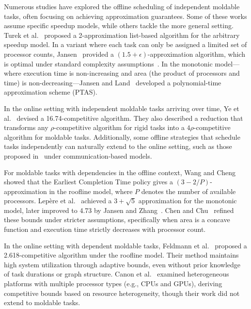 \documentclass{article}
\begin{document}
Numerous studies have explored the offline scheduling of independent moldable tasks, often focusing on achieving approximation guarantees. Some of these works assume specific speedup models, while others tackle the more general setting. Turek et al.~\cite{Turek92} proposed a 2-approximation list-based algorithm for the arbitrary speedup model. In a variant where each task can only be assigned a limited set of processor counts, Jansen~\cite{Jansen12_3over2} provided a $(1.5 + \epsilon)$-approximation algorithm, which is optimal under standard complexity        assumptions~\cite{Johannes06_list}. In the monotonic model—where execution time is non-increasing and area (the product of processors and time) is non-decreasing—Jansen and Land~\cite{Jansen18_PTAS} developed a polynomial-time approximation scheme (PTAS).

In the online setting with independent moldable tasks arriving over time, Ye et al.~\cite{Ye18_online} devised a 16.74-competitive algorithm. They also described a reduction that transforms any $\rho$-competitive algorithm for rigid tasks into a $4\rho$-competitive algorithm for moldable tasks. Additionally, some offline strategies that schedule tasks independently can naturally extend to the online setting, such as those proposed in~\cite{Havill08_SET, Dutton07_ECT, Kell15_Improved} under communication-based models.

For moldable tasks with dependencies in the offline context, Wang and Cheng~\cite{Wang92_DAG} showed that the Earliest Completion Time policy gives a $(3 - 2/P)$-approximation in the roofline model, where $P$ denotes the number of available processors. Lep\`{e}re et al.~\cite{Lepere01_DAG} achieved a $3 + \sqrt{5}$ approximation for the monotonic model, later improved to 4.73 by Jansen and Zhang~\cite{Jansen06_DAG}. Chen and Chu~\cite{Chen13_concave} refined these bounds under stricter assumptions, specifically when area is a concave function and execution time strictly decreases with processor count.

In the online setting with dependent moldable tasks, Feldmann et al.~\cite{Feldmann98_DAG} proposed a 2.618-competitive algorithm under the roofline model. Their method maintains high system utilization through adaptive bounds, even without prior knowledge of task durations or graph structure. Canon et al.~\cite{Canon20_online} examined heterogeneous platforms with multiple processor types (e.g., CPUs and GPUs), deriving competitive bounds based on resource heterogeneity, though their work did not extend to moldable tasks.
\end{document}
